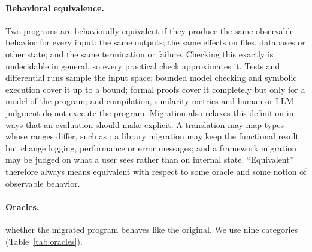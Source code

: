\begin{added}
\paragraph{Behavioral equivalence.} Two programs are behaviorally equivalent if they produce the same observable behavior for every input: the same outputs; the same effects on files, databases or other state; and the same termination or failure. Checking this exactly is undecidable in general, so every practical check approximates it. Tests and differential runs sample the input space; bounded model checking and symbolic execution cover it up to a bound; formal proofs cover it completely but only for a model of the program; and compilation, similarity metrics and human or LLM judgment do not execute the program. Migration also relaxes this definition in ways that an evaluation should make explicit. A translation may map types whose ranges differ, such as ; a library migration may keep the functional result but change logging, performance or error messages; and a framework migration may be judged on what a user sees rather than on internal state. ``Equivalent'' therefore always means equivalent with respect to some oracle and some notion of observable behavior.
\end{added}

\paragraph{Oracles.}  whether the migrated program behaves like the original. We use nine categories (Table~\ref{tab:oracles}).

